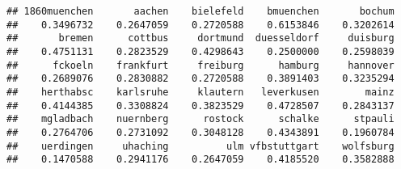 \documentclass[]{article}
\newenvironment{Shaded}{\begin{snugshade}}{\end{snugshade}}
\newcommand{\KeywordTok}[1]{\textcolor[rgb]{0.13,0.29,0.53}{\textbf{#1}}}
\newcommand{\DecValTok}[1]{\textcolor[rgb]{0.00,0.00,0.81}{#1}}
\newcommand{\StringTok}[1]{\textcolor[rgb]{0.31,0.60,0.02}{#1}}
\newcommand{\CommentTok}[1]{\textcolor[rgb]{0.56,0.35,0.01}{\textit{#1}}}
\newcommand{\OtherTok}[1]{\textcolor[rgb]{0.56,0.35,0.01}{#1}}
\newcommand{\ControlFlowTok}[1]{\textcolor[rgb]{0.13,0.29,0.53}{\textbf{#1}}}
\newcommand{\OperatorTok}[1]{\textcolor[rgb]{0.81,0.36,0.00}{\textbf{#1}}}
\newcommand{\NormalTok}[1]{#1}
\begin{document}
\begin{Shaded}
\end{Shaded}

\begin{verbatim}
## 1860muenchen       aachen    bielefeld    bmuenchen       bochum 
##    0.3496732    0.2647059    0.2720588    0.6153846    0.3202614 
##       bremen      cottbus     dortmund  duesseldorf     duisburg 
##    0.4751131    0.2823529    0.4298643    0.2500000    0.2598039 
##      fckoeln    frankfurt     freiburg      hamburg     hannover 
##    0.2689076    0.2830882    0.2720588    0.3891403    0.3235294 
##    herthabsc    karlsruhe     klautern   leverkusen        mainz 
##    0.4144385    0.3308824    0.3823529    0.4728507    0.2843137 
##    mgladbach    nuernberg      rostock      schalke      stpauli 
##    0.2764706    0.2731092    0.3048128    0.4343891    0.1960784 
##    uerdingen     uhaching          ulm vfbstuttgart    wolfsburg 
##    0.1470588    0.2941176    0.2647059    0.4185520    0.3582888
\end{verbatim}
\end{document}

